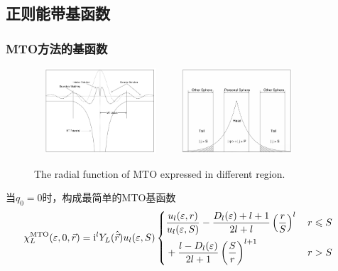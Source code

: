 \subsection{正则能带基函数}
\frame
{
	\frametitle{\textrm{MTO}方法的基函数}
\begin{figure}[h!]
	\vspace{-13pt}
\centering
\includegraphics[height=1.25in,width=1.95in,viewport=0 0 845 635,clip]{Figures/MTO-envelope-1.png}
\includegraphics[height=1.25in,width=1.95in,viewport=0 0 885 635,clip]{Figures/MTO-envelope-2.png}
\caption{\tiny \textrm{The radial function of MTO expressed in different region.}}%
\label{MTO-envelope}
\end{figure}
当$q_0=0$时，构成最简单的\textrm{MTO}基函数
		\begin{displaymath}
			\hspace*{-12pt}\chi_L^{\mathrm{MTO}}(\varepsilon,0,\vec r)=\mathrm{i}^lY_L(\hat{\vec r})u_l(\varepsilon,S)\left\{
			\begin{aligned}
				&\dfrac{u_l(\varepsilon,r)}{u_l(\varepsilon,S)}-\dfrac{D_l(\varepsilon)+l+1}{2l+l}\left(\dfrac rS\right)^l&\, r\leqslant S\\
				&+\dfrac{l-D_l(\varepsilon)}{2l+1}\left(\dfrac Sr\right)^{l+1}&\, r>S
			\end{aligned}\right.
		\end{displaymath}
}

